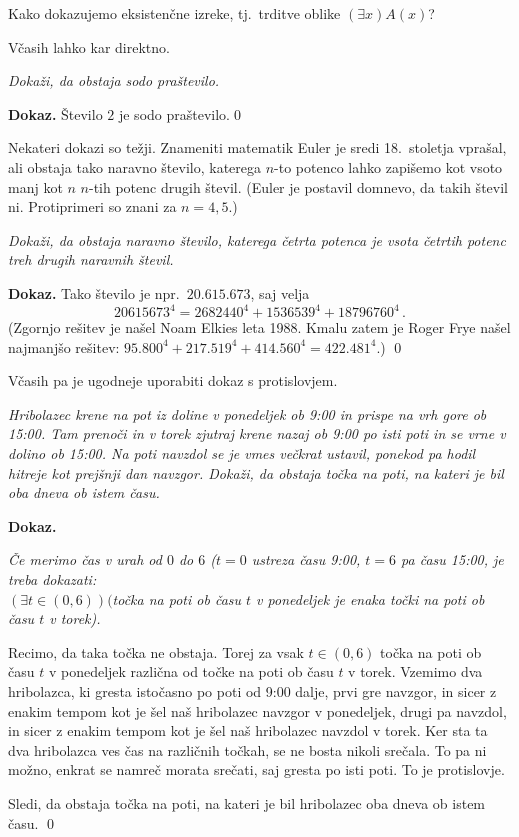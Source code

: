\documentclass[11pt,paper=b5,footinclude,headinclude]{scrbook} %
\newcounter{example}
\begin{document}
Kako dokazujemo eksistenčne izreke, tj.~trditve oblike $(\exists x)A(x)$?

Včasih lahko kar direktno.

\begin{example*}
\emph{ Dokaži, da obstaja sodo praštevilo.}

\medskip \noindent\textbf{ Dokaz.}
Število $2$ je sodo praštevilo.\qed

\bigskip
Nekateri dokazi so težji. Znameniti matematik Euler je sredi 18.~stoletja vprašal, ali obstaja tako naravno število, katerega $n$-to potenco lahko zapišemo kot vsoto manj kot $n$ $n$-tih potenc drugih števil. (Euler je postavil domnevo, da takih števil ni. Protiprimeri so znani za $n = 4,5$.)
\end{example*}
\smallskip
\begin{example*}
\emph{ Dokaži, da obstaja naravno število, katerega četrta potenca je vsota četrtih potenc treh drugih naravnih števil.}

\medskip \noindent\textbf{ Dokaz.}
Tako število je npr.~$20.615.673$, saj velja
$$20615673^4 = 2682440^4+1536539^4+18796760^4\,.$$
(Zgornjo rešitev je našel Noam Elkies leta 1988. Kmalu zatem je Roger Frye našel najmanjšo rešitev: $95.800^4 + 217.519^4 + 414.560^4 = 422.481^4$.)
\qed


Včasih pa je ugodneje uporabiti dokaz s protislovjem.
\end{example*}
\medskip
\begin{example*}
\emph{ Hribolazec krene na pot iz doline v ponedeljek ob 9:00 in prispe na vrh gore ob 15:00. Tam prenoči in v torek zjutraj krene nazaj ob 9:00 po isti poti in se vrne v dolino ob 15:00. Na poti navzdol se je vmes večkrat ustavil, ponekod pa hodil hitreje kot prejšnji dan navzgor.
Dokaži, da obstaja točka na poti, na kateri je bil oba dneva ob istem času.}

\medskip \noindent\textbf{ Dokaz.}

\emph{ Če merimo čas v urah od $0$ do $6$ ($t = 0$ ustreza času 9:00, $t = 6$ pa času 15:00, je treba dokazati:\\
 $(\exists t\in (0,6))($točka na poti ob času $t$ v ponedeljek je enaka točki na poti ob času $t$ v torek).}

Recimo, da taka točka ne obstaja. Torej za vsak $t\in (0,6)$ točka na poti ob času $t$ v ponedeljek različna od točke na poti ob času $t$ v torek.
Vzemimo dva hribolazca, ki gresta istočasno po poti od 9:00 dalje, prvi gre navzgor,
in sicer z enakim tempom kot je šel naš hribolazec navzgor v ponedeljek, drugi pa navzdol,
in sicer z enakim tempom kot je šel naš hribolazec navzdol v torek.
Ker sta ta dva hribolazca ves čas na različnih točkah, se ne bosta nikoli srečala.
To pa ni možno, enkrat se namreč morata srečati, saj gresta po isti poti. To je protislovje.

Sledi, da obstaja točka na poti, na kateri je bil hribolazec oba dneva ob istem času.
\qed
\end{example*}
\end{document}
